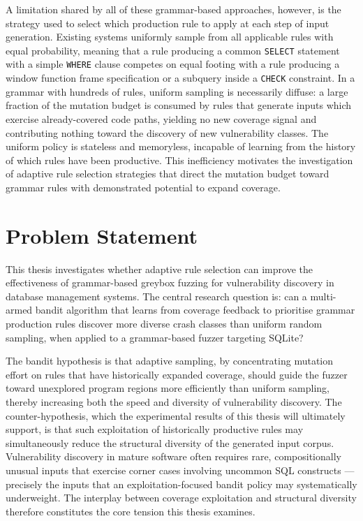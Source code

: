 A limitation shared by all of these grammar-based approaches, however, is the strategy used to select which production rule to apply at each step of input generation. Existing systems uniformly sample from all applicable rules with equal probability, meaning that a rule producing a common \texttt{SELECT} statement with a simple \texttt{WHERE} clause competes on equal footing with a rule producing a window function frame specification or a subquery inside a \texttt{CHECK} constraint. In a grammar with hundreds of rules, uniform sampling is necessarily diffuse: a large fraction of the mutation budget is consumed by rules that generate inputs which exercise already-covered code paths, yielding no new coverage signal and contributing nothing toward the discovery of new vulnerability classes. The uniform policy is stateless and memoryless, incapable of learning from the history of which rules have been productive. This inefficiency motivates the investigation of adaptive rule selection strategies that direct the mutation budget toward grammar rules with demonstrated potential to expand coverage.

\section{Problem Statement}

This thesis investigates whether adaptive rule selection can improve the effectiveness of grammar-based greybox fuzzing for vulnerability discovery in database management systems. The central research question is: can a multi-armed bandit algorithm \cite{exp3} that learns from coverage feedback to prioritise grammar production rules discover more diverse crash classes than uniform random sampling, when applied to a grammar-based fuzzer targeting SQLite?

The bandit hypothesis is that adaptive sampling, by concentrating mutation effort on rules that have historically expanded coverage, should guide the fuzzer toward unexplored program regions more efficiently than uniform sampling, thereby increasing both the speed and diversity of vulnerability discovery. The counter-hypothesis, which the experimental results of this thesis will ultimately support, is that such exploitation of historically productive rules may simultaneously reduce the structural diversity of the generated input corpus. Vulnerability discovery in mature software often requires rare, compositionally unusual inputs that exercise corner cases involving uncommon SQL constructs — precisely the inputs that an exploitation-focused bandit policy may systematically underweight. The interplay between coverage exploitation and structural diversity therefore constitutes the core tension this thesis examines.

